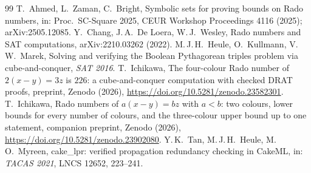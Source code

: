 \documentclass[11pt,a4paper]{article}
\theoremstyle{definition}
\theoremstyle{remark}
\begin{document}
\clearpage
\begin{thebibliography}{99}
 T.~Ahmed, L.~Zaman, C.~Bright, Symbolic sets for proving bounds on Rado numbers, in: Proc.\ SC-Square 2025, CEUR Workshop Proceedings 4116 (2025); arXiv:2505.12085.
 Y.~Chang, J.\,A.~De Loera, W.\,J.~Wesley, Rado numbers and SAT computations, arXiv:2210.03262 (2022).
 M.\,J.\,H.~Heule, O.~Kullmann, V.\,W.~Marek, Solving and verifying the Boolean Pythagorean triples problem via cube-and-conquer, \emph{SAT 2016}.
 T.~Ichikawa, The four-colour Rado number of $2(x-y)=3z$ is $226$: a cube-and-conquer computation with checked DRAT proofs, preprint, Zenodo (2026), \url{https://doi.org/10.5281/zenodo.23582301}.
 T.~Ichikawa, Rado numbers of $a(x-y)=bz$ with $a<b$: two colours, lower bounds for every number of colours, and the three-colour upper bound up to one statement, companion preprint, Zenodo (2026), \url{https://doi.org/10.5281/zenodo.23902080}.
 Y.\,K.~Tan, M.\,J.\,H.~Heule, M.\,O.~Myreen, cake\_lpr: verified propagation redundancy checking in CakeML, in: \emph{TACAS 2021}, LNCS 12652, 223--241.
\end{thebibliography}
\end{document}
